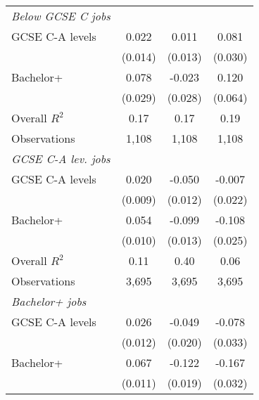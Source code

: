 \begin{center}
\begin{threeparttable}[!h]
\begin{tabular}{lccc}
\midrule\textit{Below GCSE C jobs}\vspace{1mm} \\ 
\hspace{3mm}GCSE C-A levels&       0.022         &       0.011         &       0.081\sym{**} \\
                    &     (0.014)         &     (0.013)         &     (0.030)         \\
\hspace{3mm}Bachelor+&       0.078\sym{**} &      -0.023         &       0.120         \\
                    &     (0.029)         &     (0.028)         &     (0.064)         \\
\midrule Overall $ R^2$&        0.17         &        0.17         &        0.19         \\
Observations        &       1,108         &       1,108         &       1,108         \\
\midrule\textit{GCSE C-A lev. jobs}\vspace{1mm} \\ 
\hspace{3mm}GCSE C-A levels&       0.020\sym{*}  &      -0.050\sym{***}&      -0.007         \\
                    &     (0.009)         &     (0.012)         &     (0.022)         \\
\hspace{3mm}Bachelor+&       0.054\sym{***}&      -0.099\sym{***}&      -0.108\sym{***}\\
                    &     (0.010)         &     (0.013)         &     (0.025)         \\
\midrule Overall $ R^2$&        0.11         &        0.40         &        0.06         \\
Observations        &       3,695         &       3,695         &       3,695         \\
\midrule\textit{Bachelor+ jobs}\vspace{1mm} \\ 
\hspace{3mm}GCSE C-A levels&       0.026\sym{*}  &      -0.049\sym{*}  &      -0.078\sym{*}  \\
                    &     (0.012)         &     (0.020)         &     (0.033)         \\
\hspace{3mm}Bachelor+&       0.067\sym{***}&      -0.122\sym{***}&      -0.167\sym{***}\\
                    &     (0.011)         &     (0.019)         &     (0.032)         \\

\end{tabular}
\end{threeparttable}
\end{center}

